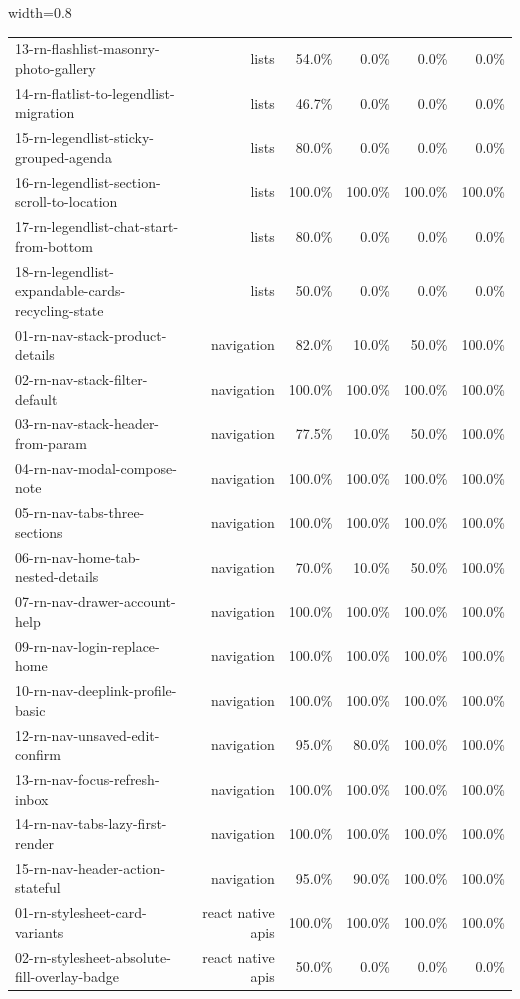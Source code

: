 \begin{table}[htbp]
\begin{adjustbox}{width=0.8\textwidth}
\begin{tabular}{lrrrrr}
13-rn-flashlist-masonry-photo-gallery & lists & 54.0\% & 0.0\% & 0.0\% & 0.0\% \\
14-rn-flatlist-to-legendlist-migration & lists & 46.7\% & 0.0\% & 0.0\% & 0.0\% \\
15-rn-legendlist-sticky-grouped-agenda & lists & 80.0\% & 0.0\% & 0.0\% & 0.0\% \\
16-rn-legendlist-section-scroll-to-location & lists & 100.0\% & 100.0\% & 100.0\% & 100.0\% \\
17-rn-legendlist-chat-start-from-bottom & lists & 80.0\% & 0.0\% & 0.0\% & 0.0\% \\
18-rn-legendlist-expandable-cards-recycling-state & lists & 50.0\% & 0.0\% & 0.0\% & 0.0\% \\
01-rn-nav-stack-product-details & navigation & 82.0\% & 10.0\% & 50.0\% & 100.0\% \\
02-rn-nav-stack-filter-default & navigation & 100.0\% & 100.0\% & 100.0\% & 100.0\% \\
03-rn-nav-stack-header-from-param & navigation & 77.5\% & 10.0\% & 50.0\% & 100.0\% \\
04-rn-nav-modal-compose-note & navigation & 100.0\% & 100.0\% & 100.0\% & 100.0\% \\
05-rn-nav-tabs-three-sections & navigation & 100.0\% & 100.0\% & 100.0\% & 100.0\% \\
06-rn-nav-home-tab-nested-details & navigation & 70.0\% & 10.0\% & 50.0\% & 100.0\% \\
07-rn-nav-drawer-account-help & navigation & 100.0\% & 100.0\% & 100.0\% & 100.0\% \\
09-rn-nav-login-replace-home & navigation & 100.0\% & 100.0\% & 100.0\% & 100.0\% \\
10-rn-nav-deeplink-profile-basic & navigation & 100.0\% & 100.0\% & 100.0\% & 100.0\% \\
12-rn-nav-unsaved-edit-confirm & navigation & 95.0\% & 80.0\% & 100.0\% & 100.0\% \\
13-rn-nav-focus-refresh-inbox & navigation & 100.0\% & 100.0\% & 100.0\% & 100.0\% \\
14-rn-nav-tabs-lazy-first-render & navigation & 100.0\% & 100.0\% & 100.0\% & 100.0\% \\
15-rn-nav-header-action-stateful & navigation & 95.0\% & 90.0\% & 100.0\% & 100.0\% \\
01-rn-stylesheet-card-variants & react native apis & 100.0\% & 100.0\% & 100.0\% & 100.0\% \\
02-rn-stylesheet-absolute-fill-overlay-badge & react native apis & 50.0\% & 0.0\% & 0.0\% & 0.0\% \\

\end{tabular}
\end{adjustbox}
\end{table}
